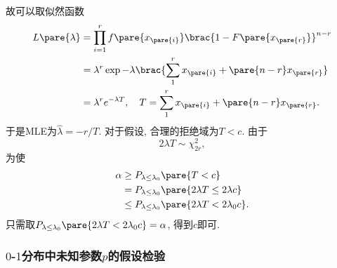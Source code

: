 \documentclass[../Statistics.tex]{subfiles}
\begin{document}
\begin{sample}
\begin{ex}[截尾试验]
\begin{cenum}
        故可以取似然函数
        \begin{align*}
            L\pare{\lambda} &= \prod_{i=1}^r f\pare{x_{\pare{i}}}\brac{1-F\pare{x_{\pare{r}}}}^{n-r} \\
            &= \lambda^r \exp{-\lambda \brac{\sum_1^r x_{\pare{i}} + \pare{n-r}x_{\pare{r}}}} \\
            &= \lambda^r e^{-\lambda T},\quad T = \sum_1^r x_{\pare{i}} + \pare{n-r}x_{\pare{r}}.
        \end{align*}
        于是MLE为$\hat\lambda = -r/T$. 对于假设, 合理的拒绝域为$T<c$. 由于
        \[ 2\lambda T \sim \chi_{2r}^2, \]
        为使
        \begin{align*}
            \alpha &\ge P_{\lambda\le \lambda_0}\pare{T<c} \\
            &= P_{\lambda \le \lambda_0}\pare{2\lambda T \le 2\lambda c} \\
            &\le P_{\lambda\le\lambda_0} \pare{2\lambda T < 2\lambda_0 c}.
        \end{align*}
        只需取$P_{\lambda\le\lambda_0} \pare{2\lambda T < 2\lambda_0 c} = \alpha$, 得到$c$即可.
    \end{cenum}
\end{ex}
\end{sample}

\subsubsection{\texorpdfstring{$0$-$1$}{0-1}分布中未知参数\texorpdfstring{$p$}{p}的假设检验} %
\label{ssub:0_1分布中未知参数}
\end{document}
